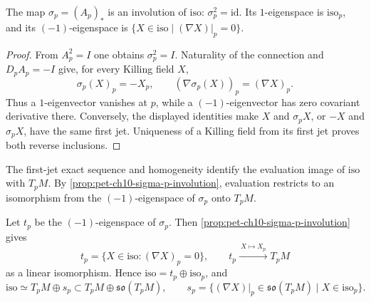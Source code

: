 \begin{proposition}
  \label{prop:pet-ch10-sigma-p-involution}
  The map $\sigma_p=(A_p)_*$ is an involution of $\mathrm{iso}$: $\sigma_p^2=\mathrm{id}$.
  Its $1$-eigenspace is $\mathrm{iso}_p$, and its $(-1)$-eigenspace is
  $\{X\in\mathrm{iso}\mid(\nabla X)|_p=0\}$.
\end{proposition}
\begin{proof}
  \sketch
  From $A_p^2=I$ one obtains $\sigma_p^2=I$. Naturality of the connection and
  $D_pA_p=-I$ give, for every Killing field $X$,
  \[
    \sigma_p(X)_p=-X_p,\qquad
    (\nabla\sigma_p(X))_p=(\nabla X)_p.
  \]
  Thus a $1$-eigenvector vanishes at $p$, while a $(-1)$-eigenvector has zero
  covariant derivative there. Conversely, the displayed identities make
  $X$ and $\sigma_pX$, or $-X$ and $\sigma_pX$, have the same first jet.
  Uniqueness of a Killing field from its first jet proves both reverse
  inclusions.
\end{proof}

The first-jet exact sequence and homogeneity identify the evaluation image of
$\mathrm{iso}$ with $T_pM$. By \cref{prop:pet-ch10-sigma-p-involution}, evaluation
restricts to an isomorphism from the $(-1)$-eigenspace of $\sigma_p$ onto
$T_pM$.

\begin{definition}
  \label{def:pet-ch10-tp-decomposition}
  Let $t_p$ be the $(-1)$-eigenspace of $\sigma_p$. Then
  \cref{prop:pet-ch10-sigma-p-involution} gives
  \[
    t_p=\{X\in\mathrm{iso}:(\nabla X)_p=0\},\qquad
    t_p\xrightarrow{\ X\mapsto X_p\ }T_pM
  \]
  as a linear isomorphism. Hence $\mathrm{iso}=t_p\oplus\mathrm{iso}_p$, and
  \[
    \mathrm{iso}\simeq T_pM\oplus s_p\subset T_pM\oplus\mathfrak{so}(T_pM),
    \qquad
    s_p=\{(\nabla X)|_p\in\mathfrak{so}(T_pM)\mid X\in\mathrm{iso}_p\}.
  \]
\end{definition}

